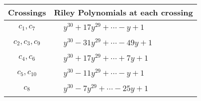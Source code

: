 \documentclass[1p]{elsarticle_modified}
\theoremstyle{definition}
\begin{document}
\begin{tabular}{m{50pt}|m{274pt}}
Crossings & \hspace{64pt}Riley Polynomials at each crossing \\
\hline $$\begin{aligned}c_{1},c_{7}\end{aligned}$$&$\begin{aligned}
&y^{30}+17 y^{29}+\cdots- y+1
\end{aligned}$\\
\hline $$\begin{aligned}c_{2},c_{3},c_{9}\end{aligned}$$&$\begin{aligned}
&y^{30}-31 y^{29}+\cdots-49 y+1
\end{aligned}$\\
\hline $$\begin{aligned}c_{4},c_{6}\end{aligned}$$&$\begin{aligned}
&y^{30}+17 y^{29}+\cdots+7 y+1
\end{aligned}$\\
\hline $$\begin{aligned}c_{5},c_{10}\end{aligned}$$&$\begin{aligned}
&y^{30}-11 y^{29}+\cdots- y+1
\end{aligned}$\\
\hline $$\begin{aligned}c_{8}\end{aligned}$$&$\begin{aligned}
&y^{30}-7 y^{29}+\cdots-25 y+1
\end{aligned}$\\
\hline
\end{tabular}
\vskip 2pc
\end{document}
